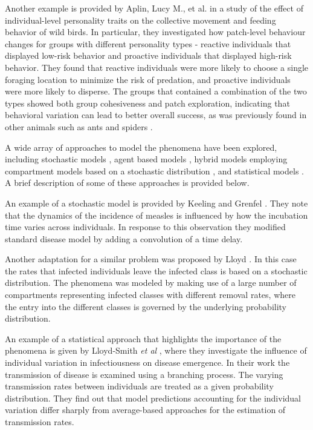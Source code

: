 \documentclass[review]{elsarticle}
\begin{document}

Another example is provided by Aplin, Lucy M., et al. \cite{doi:10.1098/rspb.2014.1016} in a study of the effect of individual-level personality traits on the collective movement and feeding behavior of wild birds. In particular, they investigated how patch-level behaviour changes for groups with different personality types - reactive individuals that displayed low-risk behavior and proactive individuals that displayed high-risk behavior. They found that  reactive individuals were more likely to choose a single foraging location to minimize the risk of predation, and proactive individuals were more likely to disperse. The groups that contained a combination of the two types showed both group cohesiveness and patch exploration, indicating that behavioral variation can lead to better overall success, as was previously found in  other animals such as ants and spiders \cite{ doi:10.1086/687235,modlmeier2011productivity,modlmeier2012diverse}.

A wide array of approaches to model the phenomena have been
explored, including stochastic
models \cite{Keeling65}, agent based models \cite{doi:10.1086/687235},
hybrid models employing compartment models based on a stochastic
distribution \cite{doi:10.1098/rspb.2001.1599}, and statistical
models \cite{SuperspreadingLloyd}. A brief description of some of these
approaches is provided below.

An example of a stochastic model is provided by Keeling and
Grenfel \cite{Keeling65}. They note that the dynamics of the incidence
of measles is influenced by how the incubation time varies across
individuals. In response to this observation they modified standard
disease model by adding a convolution of a time delay.


Another adaptation for a similar problem was proposed by
Lloyd \cite{doi:10.1098/rspb.2001.1599}. In this case the rates that
infected individuals leave the infected class is based on a stochastic
distribution. The phenomena was modeled by making use of a large
number of compartments representing infected classes with different removal rates, where the entry into the different classes is
governed by the underlying probability distribution.

An example of a statistical approach that highlights the importance of
the phenomena is given by Lloyd-Smith \textit{et
  al} \cite{SuperspreadingLloyd}, where they investigate the influence of individual variation in infectiousness on disease emergence. In their work the transmission of
disease is examined using a branching process. The varying
transmission rates between individuals are treated as a given
probability distribution. They find out that model predictions accounting for the individual variation differ sharply from average-based approaches for the estimation of transmission rates.
\end{document}
